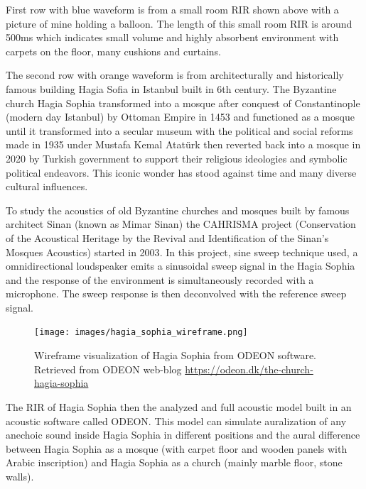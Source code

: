             First row with blue waveform is from a small room RIR shown above with a picture of mine holding a balloon. The length of this small room RIR is around 500ms which indicates small volume and highly absorbent environment with carpets on the floor, many cushions and curtains.\par 
            
            The second row with orange waveform is from architecturally and historically famous building Hagia Sofia in Istanbul built in 6th century. The Byzantine church Hagia Sophia transformed into a mosque after conquest of Constantinople (modern day Istanbul) by Ottoman Empire in 1453 and functioned as a mosque until it transformed into a secular museum with the political and social reforms made in 1935 under Mustafa Kemal Atatürk then reverted back into a mosque in 2020 by Turkish government to support their religious ideologies and symbolic political endeavors\cite{Evolution_of_Hagia_Sophia}. This iconic wonder has stood against time and many diverse cultural influences.\par

            To study the acoustics of old Byzantine churches and mosques built by famous architect Sinan (known as Mimar Sinan) the CAHRISMA project (Conservation of the Acoustical Heritage by the Revival and Identification of the Sinan’s Mosques Acoustics) started in 2003\cite{Hagia_Sophia_Multisensory_Aestethics}. In this project, sine sweep technique used, a omnidirectional loudspeaker emits a sinusoidal sweep signal in the Hagia Sophia and the response of the environment is simultaneously recorded with a microphone. The sweep response is then deconvolved with the reference sweep signal\cite{Odeon_Hagia_Sophia}.\par

            \begin{figure}[H]
                \centering
                \texttt{[image: images/hagia\_sophia\_wireframe.png]}
                \caption{Wireframe visualization of Hagia Sophia from ODEON software. Retrieved from ODEON web-blog \url{https://odeon.dk/the-church-hagia-sophia}}
                \label{fig:HS_WIREFRAME}
            \end{figure} 

            The RIR of Hagia Sophia then the analyzed and full acoustic model built in an acoustic software called ODEON\cite{Odeon_Hagia_Sophia}. This model can simulate auralization of any anechoic sound inside Hagia Sophia in different positions and the aural difference between Hagia Sophia as a mosque (with carpet floor and wooden panels with Arabic inscription) and Hagia Sophia as a church (mainly marble floor, stone walls)\cite{Revived_Acoustical_History_of_Hagia_Sophia}.\par

